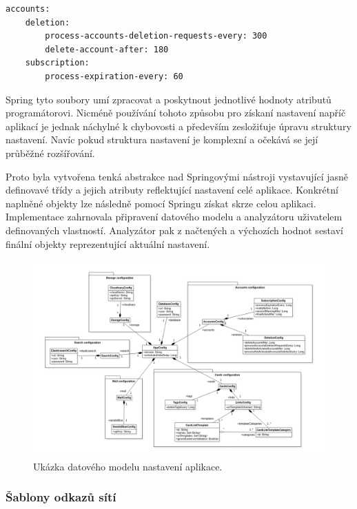 		\begin{lstlisting}[caption={Ukázka části nastavení aplikace v YAML konfiguračním souboru. Zdroj: [autor]}]
accounts:
	deletion:
		process-accounts-deletion-requests-every: 300
		delete-account-after: 180
	subscription:
		process-expiration-every: 60
		\end{lstlisting}

		Spring tyto soubory umí zpracovat a poskytnout jednotlivé hodnoty atributů programátorovi.
		Nicméně používání tohoto způsobu pro získaní nastavení napříč aplikací je jednak náchylné k chybovosti a
		především zesložiťuje úpravu struktury nastavení.
		Navíc pokud struktura nastavení je komplexní a očekává se její průběžné rozšířování.

		Proto byla vytvořena tenká abstrakce nad Springovými nástroji vystavující jasně definovavé třídy a jejich atributy
		reflektující nastavení celé aplikace.
		Konkrétní naplněné objekty lze následně pomocí Springu získat skrze celou aplikaci.
		Implementace zahrnovala připravení datového modelu a analyzátoru uživatelem definovaných vlastností.
		Analyzátor pak z načtených a výchozích hodnot sestaví finální objekty reprezentující aktuální nastavení.

		\begin{figure}[H]
			\centering
			\includegraphics[width=\linewidth]{obrazky/datovy_model_nastaveni_aplikace}\hfill
			\caption{Ukázka datového modelu nastavení aplikace.}
		\end{figure}

		\subsubsection{Šablony odkazů sítí}

